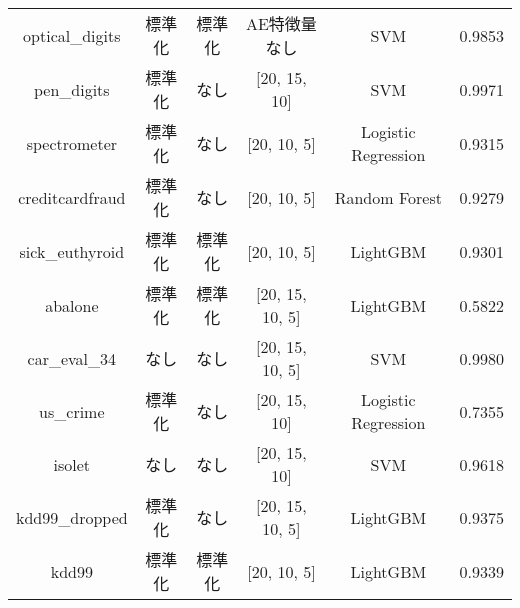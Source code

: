 \begin{table}[htbp]
\begin{tabular}{cccccc}
        optical\_digits & 標準化 & 標準化 & AE特徴量なし & SVM & 0.9853\\
        pen\_digits & 標準化 & なし & [20, 15, 10] & SVM & 0.9971\\
        spectrometer & 標準化 & なし & [20, 10, 5] & Logistic Regression & 0.9315\\
        creditcardfraud & 標準化 & なし & [20, 10, 5] & Random Forest & 0.9279\\
        sick\_euthyroid & 標準化 & 標準化 & [20, 10, 5] & LightGBM & 0.9301\\
        abalone & 標準化 & 標準化 & [20, 15, 10, 5] & LightGBM & 0.5822\\
        car\_eval\_34 & なし & なし & [20, 15, 10, 5] & SVM & 0.9980\\
        us\_crime & 標準化 & なし & [20, 15, 10] & Logistic Regression & 0.7355\\
        isolet & なし & なし & [20, 15, 10] & SVM & 0.9618\\
        kdd99\_dropped & 標準化 & なし & [20, 15, 10, 5] & LightGBM & 0.9375\\
        kdd99 & 標準化 & 標準化 & [20, 10, 5] & LightGBM & 0.9339\\
        \hline

    \end{tabular}
\end{table}